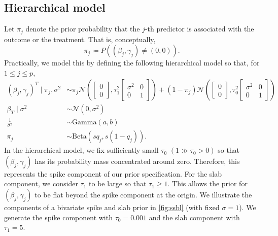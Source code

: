 \documentclass[preprint,12pt]{elsarticle}
\newcommand{\normal}{\mathcal{N}}
\begin{document}
\subsection{Hierarchical model}

Let $\pi_j$ denote the prior probability that the $j$-th
predictor is associated with the outcome or the 
treatment. That is, conceptually,
\begin{equation}
	\pi_j \coloneqq P\left((\beta_j,\gamma_j)\not=(0,0)\right).
\end{equation}
Practically, we model this by defining the following hierarchical model
so that,
for $1\le j\le p$,
\begin{align}
	(\beta_j,\gamma_j)^T \mid \pi_{j}, \sigma^2 &\sim 
	\pi_{j}\normal\left( \begin{bmatrix}
		0 \\
		0
	\end{bmatrix}, 
	\tau_1^2\begin{bmatrix}
		\sigma^2 & 0 \\
		0 & 1
	\end{bmatrix}\right)
	+ (1-\pi_{j}) \normal\left(\begin{bmatrix}
		0 \\
		0
	\end{bmatrix}, 
	\tau_0^2\begin{bmatrix}
		\sigma^2 & 0 \\
		0 & 1
	\end{bmatrix}\right)\\
	\beta_T\mid \sigma^2 &\sim \normal\left(0, \sigma^2\right)\\
        \frac{1}{\sigma^2}&\sim \text{Gamma}(a, b)\\
	\pi_{j} &\sim\text{Beta}\left(sq_j, s(1-q_j)\right).
\end{align}
In the hierarchical model, we fix sufficiently small $\tau_0$
$(1\gg\tau_0>0)$ so that  $(\beta_j, \gamma_j)$ has its probability mass 
concentrated around zero. Therefore, this represents the spike component of our prior specification. 
For the slab component, we consider $\tau_1$ to be large so that $\tau_1\ge 1$. This allows the prior for $(\beta_j,\gamma_j)$ to be flat beyond the spike component at the origin. 
We illustrate the components of a bivariate spike and slab prior in 
\cref{fig:ssbl} (with fixed $\sigma=1$). We generate the spike component 
with $\tau_0=0.001$ and the slab component with $\tau_1=5$.
\end{document}
